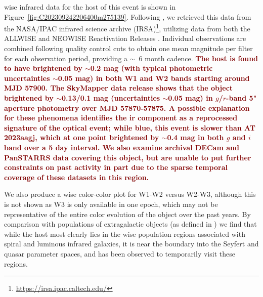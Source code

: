 \documentclass[twocolumn]{aastex631}
\newcommand{\response}[1]{\textbf{\textcolor{maroon}{#1}}}
\begin{document}
\gls{wise} \citep{wrightWIDEFIELDINFRAREDSURVEY2010} infrared data for the host of this event is shown in Figure~\ref{fig:C202309242206400m275139}.
Following \citet{Clark2024}, we retrieved this data from the NASA/IPAC infrared science archive (IRSA)\footnote{\url{https://irsa.ipac.caltech.edu/}}, utilizing data from both the ALLWISE \citep{wright_2010_WIDEFIELDINFRAREDSURVEY} and NEOWISE Reactivation Releases \citep[NEOWISE-R;][]{mainzer_2011_NEOWISEOBSERVATIONSNEAREARTH, mainzer_2014_INITIALPERFORMANCENEOWISE}.
Individual observations are combined following quality control cuts to obtain one mean magnitude per filter for each observation period, providing a $\sim$~6 month cadence.
\response{
The host is found to have brightened by $\sim$0.2 mag (with typical photometric uncertainties $\sim$0.05 mag) in both W1 and W2 bands starting around MJD 57900.
The SkyMapper data release \citep{skymapper} shows that the object brightened by $\sim$0.13/0.1 mag (uncertainties $\sim$0.05 mag) in $g$/$r$-band 5" aperture photometry over MJD 57870-57875.
A possible explanation for these phenomena identifies the \gls{ir} component as a reprocessed signature of the optical event; while blue, this event is slower than AT 2023aagj, which at one point brightened by $\sim$0.4 mag in both $g$ and $i$ band over a 5 day interval.
We also examine archival DECam and PanSTARRS \citep{Flewelling_2020} data covering this object, but are unable to put further constraints on past activity in part due to the sparse temporal coverage of these datasets in this region.
}


We also produce a \gls{wise} color-color plot for W1-W2 versus W2-W3, although this is not shown as W3 is only available in one epoch, which may not be representative of the entire color evolution of the object over the past years.
By comparison with populations of extragalactic objects (as defined in \citealt{wrightWIDEFIELDINFRAREDSURVEY2010}) we find that while the host most clearly lies in the \gls{wise} population regions associated with spiral and luminous infrared galaxies, it is near the boundary into the Seyfert and quasar parameter spaces, and %
has been observed to temporarily visit these regions.

\end{document}
